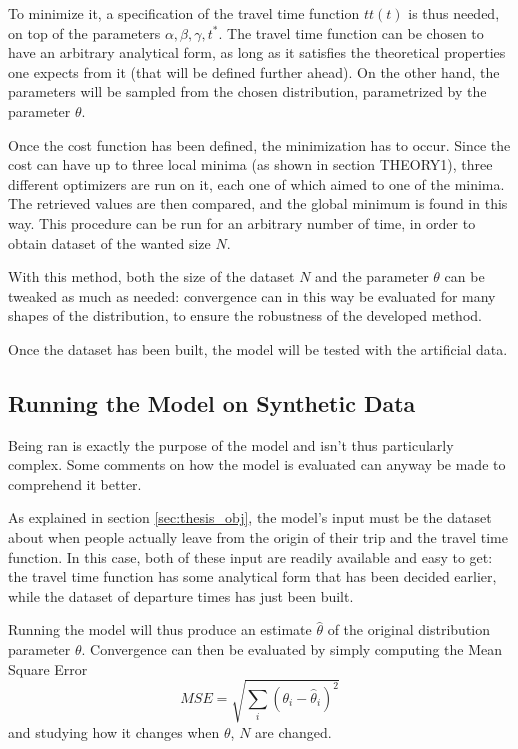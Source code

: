To minimize it, a specification of the travel time function \(tt(t)\) is thus needed,
on top of the parameters \(\alpha, \beta, \gamma, t^*\).
The travel time function can be chosen to have an arbitrary analytical form,
as long as it satisfies the theoretical properties one expects from it (that will be defined further ahead).
On the other hand, the parameters will be sampled from the chosen distribution,
parametrized by the parameter \(\theta\).

Once the cost function has been defined,
the minimization has to occur.
Since the cost can have up to three local minima (as shown in section  THEORY1),
three different optimizers are run on it,
each one of which aimed to one of the minima.
The retrieved values are then compared, and the global minimum is found in this way.
This procedure can be run for an arbitrary number of time,
in order to obtain dataset of the wanted size \(N\).

With this method, both the size of the dataset \(N\) and the parameter \(\theta\) can be tweaked as much as needed:
convergence can in this way be evaluated for many shapes of the distribution,
to ensure the robustness of the developed method.

Once the dataset has been built,
the model will be tested with the artificial data.

\subsection{Running the Model on Synthetic Data}
\label{sec:run_synth_dataset}

Being ran is exactly the purpose of the model and isn't thus particularly complex.
Some comments on how the model is evaluated can anyway be made to comprehend it better.

As explained in section \ref{sec:thesis_obj},
the model's input must be the dataset about when people actually leave from the origin of their trip and the travel time function.
In this case, both of these input are readily available and easy to get:
the travel time function has some analytical form that has been decided earlier,
while the dataset of departure times has just been built.

Running the model will thus produce an estimate \(\hat{\theta}\) of the original distribution parameter \(\theta\).
Convergence can then be evaluated by simply computing the Mean Square Error
\begin{equation*}
  MSE = \sqrt{\sum_i (\theta_i - \hat{\theta}_i)^2}
\end{equation*}
and studying how it changes when \(\theta\), \(N\) are changed.

